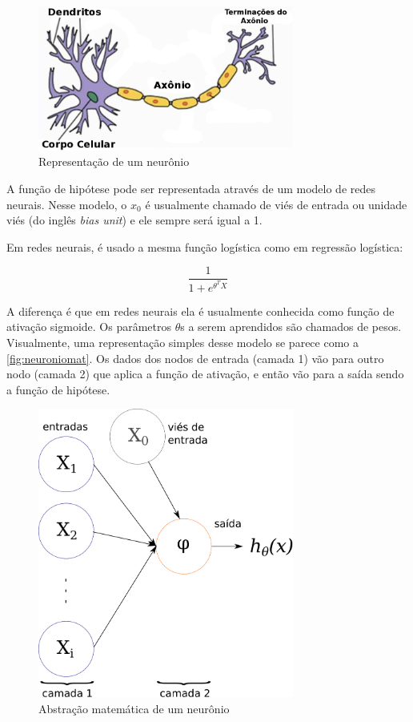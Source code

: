 \begin{figure}
\centering
\caption{Representação de um neurônio} \label{fig:neuronio}
\includegraphics[width=0.75\textwidth]{img/neuron}
\end{figure}


A função de hipótese pode ser representada através de um modelo de redes neurais. Nesse modelo, o $x_0$ é usualmente chamado de viés de entrada ou unidade viés (do inglês \textit{bias unit}) e ele sempre será igual a 1.

Em redes neurais, é usado a mesma função logística como em regressão logística:

\begin{equation}
\frac{1}{1 + e^{\theta^TX}} \nonumber
\end{equation}

A diferença é que em redes neurais ela é usualmente conhecida como função de ativação sigmoide. Os parâmetros $\theta$s a serem aprendidos são chamados de pesos. Visualmente, uma representação simples desse modelo se parece como a \autoref{fig:neuroniomat}. Os dados dos nodos de entrada (camada 1) vão para outro nodo (camada 2) que aplica a função de ativação, e então vão para a saída sendo a função de hipótese.

\begin{figure}
\centering
\caption{Abstração matemática de um neurônio} \label{fig:neuroniomat}
\includegraphics[width=0.75\textwidth]{img/redeneuralmat.pdf}
\end{figure}


